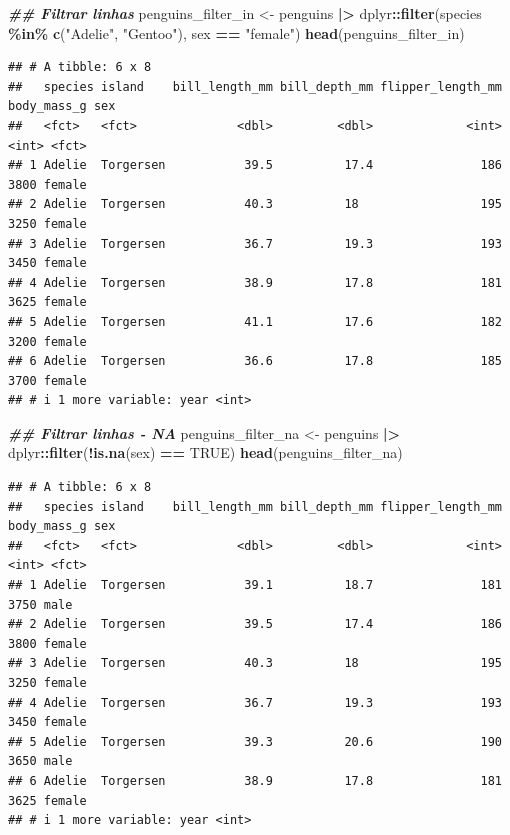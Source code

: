 \documentclass[
]{article}
\newenvironment{Shaded}{\begin{snugshade}}{\end{snugshade}}
\newcommand{\ConstantTok}[1]{\textcolor[rgb]{0.56,0.35,0.01}{#1}}
\newcommand{\DocumentationTok}[1]{\textcolor[rgb]{0.56,0.35,0.01}{\textbf{\textit{#1}}}}
\newcommand{\FunctionTok}[1]{\textcolor[rgb]{0.13,0.29,0.53}{\textbf{#1}}}
\newcommand{\NormalTok}[1]{#1}
\newcommand{\OtherTok}[1]{\textcolor[rgb]{0.56,0.35,0.01}{#1}}
\newcommand{\SpecialCharTok}[1]{\textcolor[rgb]{0.81,0.36,0.00}{\textbf{#1}}}
\newcommand{\StringTok}[1]{\textcolor[rgb]{0.31,0.60,0.02}{#1}}
\begin{document}
\begin{Shaded}
\begin{Highlighting}[]
\DocumentationTok{\#\# Filtrar linhas}
\NormalTok{penguins\_filter\_in }\OtherTok{\textless{}{-}}\NormalTok{ penguins }\SpecialCharTok{|\textgreater{}} 
\NormalTok{    dplyr}\SpecialCharTok{::}\FunctionTok{filter}\NormalTok{(species }\SpecialCharTok{\%in\%} \FunctionTok{c}\NormalTok{(}\StringTok{"Adelie"}\NormalTok{, }\StringTok{"Gentoo"}\NormalTok{),}
\NormalTok{                  sex }\SpecialCharTok{==} \StringTok{"female"}\NormalTok{)}
\FunctionTok{head}\NormalTok{(penguins\_filter\_in)}
\end{Highlighting}
\end{Shaded}

\begin{verbatim}
## # A tibble: 6 x 8
##   species island    bill_length_mm bill_depth_mm flipper_length_mm body_mass_g sex   
##   <fct>   <fct>              <dbl>         <dbl>             <int>       <int> <fct> 
## 1 Adelie  Torgersen           39.5          17.4               186        3800 female
## 2 Adelie  Torgersen           40.3          18                 195        3250 female
## 3 Adelie  Torgersen           36.7          19.3               193        3450 female
## 4 Adelie  Torgersen           38.9          17.8               181        3625 female
## 5 Adelie  Torgersen           41.1          17.6               182        3200 female
## 6 Adelie  Torgersen           36.6          17.8               185        3700 female
## # i 1 more variable: year <int>
\end{verbatim}

\begin{Shaded}
\begin{Highlighting}[]
\DocumentationTok{\#\# Filtrar linhas {-} NA}
\NormalTok{penguins\_filter\_na }\OtherTok{\textless{}{-}}\NormalTok{ penguins }\SpecialCharTok{|\textgreater{}} 
\NormalTok{    dplyr}\SpecialCharTok{::}\FunctionTok{filter}\NormalTok{(}\SpecialCharTok{!}\FunctionTok{is.na}\NormalTok{(sex) }\SpecialCharTok{==} \ConstantTok{TRUE}\NormalTok{)}
\FunctionTok{head}\NormalTok{(penguins\_filter\_na)}
\end{Highlighting}
\end{Shaded}

\begin{verbatim}
## # A tibble: 6 x 8
##   species island    bill_length_mm bill_depth_mm flipper_length_mm body_mass_g sex   
##   <fct>   <fct>              <dbl>         <dbl>             <int>       <int> <fct> 
## 1 Adelie  Torgersen           39.1          18.7               181        3750 male  
## 2 Adelie  Torgersen           39.5          17.4               186        3800 female
## 3 Adelie  Torgersen           40.3          18                 195        3250 female
## 4 Adelie  Torgersen           36.7          19.3               193        3450 female
## 5 Adelie  Torgersen           39.3          20.6               190        3650 male  
## 6 Adelie  Torgersen           38.9          17.8               181        3625 female
## # i 1 more variable: year <int>
\end{verbatim}
\end{document}

